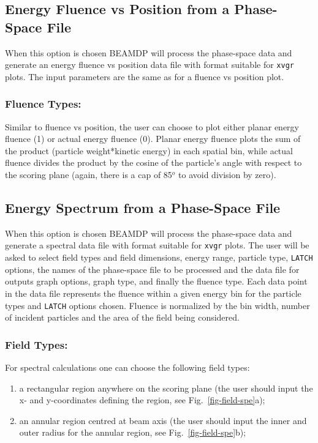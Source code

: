 \documentclass[12pt,twoside]{article}
\begin{document}
\subsection{Energy Fluence vs Position from a Phase-Space File}

When this option is chosen BEAMDP will process the phase-space data and
generate an energy fluence vs position data file with format suitable for \verb+xvgr+ plots.
The input parameters are the same as for a fluence vs position plot.

\subsubsection{Fluence Types:}
\label{fluencetype2}
Similar to fluence vs position, the user can choose to plot either planar
energy fluence (1) or actual energy fluence (0).  Planar energy fluence
plots the sum of the product (particle weight*kinetic energy) in each
spatial bin, while actual fluence divides the product by the cosine
of the particle's angle with respect to the scoring plane (again, there
is a cap of 85$^o$ to avoid division by zero).


\subsection{Energy Spectrum from a Phase-Space File}
When this option is chosen BEAMDP will process the phase-space data and
generate a spectral data file with format suitable for \verb+xvgr+ plots. The
user will be asked to select field types and field dimensions, energy
range, particle type, \verb+LATCH+ options, the
names of the phase-space file to be processed and the data file for
outputs graph options, graph type, and finally the fluence type.
Each data point in the data file represents the fluence
within a given energy bin for the particle types and
\verb+LATCH+ options chosen.  Fluence is normalized by the bin width,
number of incident particles and the area of the field being considered.

\subsubsection{Field Types:}

For spectral calculations one can choose the following field types:
\begin{enumerate}
\item a rectangular region anywhere on the scoring plane (the user should
input the  x- and y-coordinates defining the region, see
Fig.~\ref{fig-field-spe}a);

\item an annular region centred at beam axis (the user should input the
inner and outer radius for the annular region, see
Fig.~\ref{fig-field-spe}b); \end{enumerate}
\end{document}
